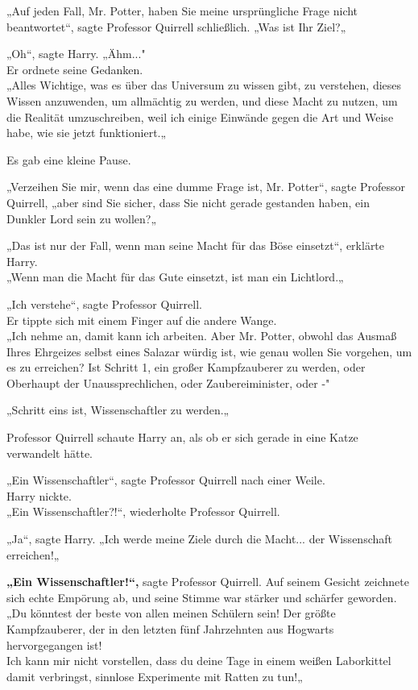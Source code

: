 {„Auf jeden Fall, Mr. Potter, haben Sie meine ursprüngliche Frage nicht beantwortet“, sagte Professor Quirrell schließlich. „Was ist Ihr Ziel?„

„Oh“, sagte Harry. „Ähm..."\\ Er ordnete seine Gedanken.\\ „Alles Wichtige, was es über das Universum zu wissen gibt, zu verstehen, dieses Wissen anzuwenden, um allmächtig zu werden, und diese Macht zu nutzen, um die Realität umzuschreiben, weil ich einige Einwände gegen die Art und Weise habe, wie sie jetzt funktioniert.„

Es gab eine kleine Pause.

„Verzeihen Sie mir, wenn das eine dumme Frage ist, Mr. Potter“, sagte Professor Quirrell, „aber sind Sie sicher, dass Sie nicht gerade gestanden haben, ein Dunkler Lord sein zu wollen?„

„Das ist nur der Fall, wenn man seine Macht für das Böse einsetzt“, erklärte Harry.\\ „Wenn man die Macht für das Gute einsetzt, ist man ein Lichtlord.„

„Ich verstehe“, sagte Professor Quirrell.\\ Er tippte sich mit einem Finger auf die andere Wange.\\ „Ich nehme an, damit kann ich arbeiten. Aber Mr. Potter, obwohl das Ausmaß Ihres Ehrgeizes selbst eines Salazar würdig ist, wie genau wollen Sie vorgehen, um es zu erreichen? Ist Schritt 1, ein großer Kampfzauberer zu werden, oder Oberhaupt der Unaussprechlichen, oder Zaubereiminister, oder -"

„Schritt eins ist, Wissenschaftler zu werden.„

Professor Quirrell schaute Harry an, als ob er sich gerade in eine Katze verwandelt hätte.

„Ein Wissenschaftler“, sagte Professor Quirrell nach einer Weile.\\ Harry nickte.\\ „Ein Wissenschaftler?!“, wiederholte Professor Quirrell.

„Ja“, sagte Harry. „Ich werde meine Ziele durch die Macht... der Wissenschaft erreichen!„

\textbf{„Ein Wissenschaftler!“,} sagte Professor Quirrell. Auf seinem Gesicht zeichnete sich echte Empörung ab, und seine Stimme war stärker und schärfer geworden.\\ „Du könntest der beste von allen meinen Schülern sein! Der größte Kampfzauberer, der in den letzten fünf Jahrzehnten aus Hogwarts hervorgegangen ist!\\ Ich kann mir nicht vorstellen, dass du deine Tage in einem weißen Laborkittel damit verbringst, sinnlose Experimente mit Ratten zu tun!„

}
